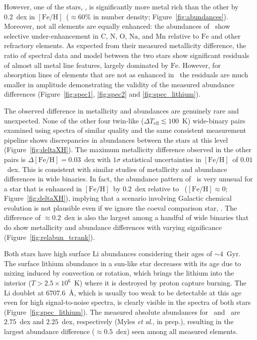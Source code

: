 \documentclass[12pt,letterpaper,margin=1in]{article}
\newcommand{\figname}{Figure}
\newcommand{\etal}{\textit{et al}.}
\newcommand*\elem[1]{\ensuremath{\mathrm{#1}}}
\newcommand*\elemH[1]{\ensuremath{[\mathrm{#1}/\elem{H}]}}
\newcommand*{\feh}{\ensuremath{\elemH{Fe}}}
\newcommand{\sunanalog}{\text{Krios}}
\newcommand{\bizarreone}{\text{Kronos}}
\begin{document}
However, one of the stars, \bizarreone, is significantly more metal rich than
the other by 0.2~dex in \feh\ ($\approx 60\%$ in number density;
\figname~\ref{fig:abundances}).
Moreover, not all elements are equally enhanced: the abundances of \bizarreone\
show selective under-enhancement in \elem{C}, \elem{N}, \elem{O}, \elem{Na},
and \elem{Mn} relative to \elem{Fe} and other refractory elements.
As expected from their measured metallicity difference, the ratio of spectral
data and model between the two stars show significant residuals of almost all
metal line features, largely dominated by \elem{Fe}.
However, for absorption lines of elements that are not as enhanced in
\bizarreone\, the residuals are much smaller in amplitude demonstrating the
validity of the measured abundance differences (\figname~\ref{fig:spec1},
\ref{fig:spec2} and \ref{fig:spec_lithium}).

The observed difference in metallicity and abundances are genuinely rare and
unexpected.
None of the other four twin-like ($\Delta T_\mathrm{eff} \lesssim 100$~K)
wide-binary pairs examined using spectra of similar quality and the same
consistent measurement pipeline shows discrepancies in abundances between the
stars at this level\cite{2016ApJS..225...32B} (\figname~\ref{fig:deltaXH}).
The maximum metallicity difference observed in the other pairs is $\Delta\feh =
0.03$~dex with $1\sigma$ statistical uncertainties in \feh\ of $0.01$~dex.
This is consistent with similar studies of metallicity and abundance
differences in wide binaries\cite{Gratton:2001aa,Desidera:2004aa}.
In fact, the abundance pattern of \bizarreone\ is very unusual
for a star that is enhanced in \feh\ by $0.2$~dex relative to \sunanalog\
($\feh\approx 0$; \figname~\ref{fig:deltaXH}),
implying that a scenario involving Galactic chemical evolution is not plausible
even if we ignore the coeval comparison star, \sunanalog.
The difference of $\approx 0.2$~dex is also the largest among a handful of wide
binaries that do show metallicity and abundance differences with varying
significance\cite{Mack:2014aa,Mack:2016aa,Saffe:2015aa,
  Teske:2013aa,Teske:2015aa,Teske:2016aa,Teske:2016ab,Biazzo:2015aa,Ramirez:2015aa}
(\figname~\ref{fig:relabun_tcrank}).

Both stars have high surface \elem{Li} abundances considering
their ages of $\sim 4$~Gyr.
The surface lithium abundance in a sun-like star decreases with its age due to
mixing induced by convection or rotation, which brings the lithium into the
interior ($T>2.5 \times 10^{6}$~K) where it is destroyed by proton capture
burning. %
The \elem{Li} doublet at $6707.6$~\AA, which is usually too weak to be
detectable at this age even for high signal-to-noise spectra, is clearly
visible in the spectra of both stars (\figname~\ref{fig:spec_lithium}).
The measured absolute abundances for \bizarreone\ and \sunanalog\ are
$2.75$~dex and $2.25$~dex, respectively (Myles \etal, in prep.),
resulting in the largest abundance difference ($\approx 0.5$~dex) seen
among all measured elements.
\end{document}
